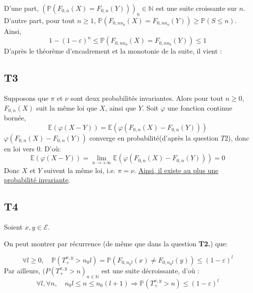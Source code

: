 \documentclass[a4paper,11pt]{article}
\def \P{\mathbb{P}}
\def \E{\mathcal{E}}
\begin{document}
\begin{center}
\end{center}


D'une part, $(\mathbb{P}(F_{0,n}(X)=F_{0,n}(Y)))_n\in \mathbb{N}$ est une suite croissante sur $n$.\\
D'autre part, pour tout $n\geq 1$, $\mathbb{P}(F_{0,nn_0}(X)=F_{0,nn_0}(Y))\geq\mathbb{P}(S\leq n)$.\\
Ainsi,
\[1-(1-\varepsilon)^n\leq\mathbb{P}(F_{0,nn_0}(X)=F_{0,nn_0}(Y))\leq1\]
D'après le théorème d'encadrement et la monotonie de la suite, il vient :

\begin{center}
\end{center}


\subsection*{T3}
Supposons que $\pi$ et $\nu$ sont deux probabilités invariantes. 
Alors pour tout $n\geq0$, $F_{0,n}(X)$ suit la même loi que $X$, ainsi que $Y$.
Soit $\varphi$ une fonction continue bornée,
\[\mathbb{E}(\varphi(X-Y))=\mathbb{E}(\varphi(F_{0,n}(X)-F_{0,n}(Y)))\]
$\varphi(F_{0,n}(X)-F_{0,n}(Y))$ converge en probabilité(d'après la question $T2$), donc en loi vers $0$.
D'où:
\[\mathbb{E}(\varphi(X-Y))=\lim \limits_{n \rightarrow +\infty}\mathbb{E}(\varphi(F_{0,n}(X)-F_{0,n}(Y)))=0\]
Donc $X$ et $Y$ suivent la même loi, i.e. $\pi = \nu$.
\underline{Ainsi, il existe au plus une probabilité invariante}.

\subsection*{T4}
Soient $x,y \in \E$.

On peut montrer par récurrence (de même que dans la question \textbf{T2.}) que:

\[\forall l\geq 0, \quad \P(T_+^{x,y}>n_0l)=\P(F_{0,n_0l}(x)\ne F_{0,n_0l}(y))\leq (1-\varepsilon)^l\]
Par ailleurs, $(P(T_+^{x,y}>n)_{n \in \mathbb{N}}$ est une suite décroissante, d'où :
\[\forall l, \forall n, \quad n_0l\leq n \leq n_0(l+1) \Rightarrow \P(T_+^{x,y}>n) \leq (1-\varepsilon)^l \]
\end{document}

